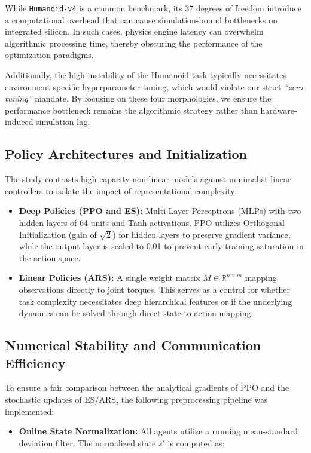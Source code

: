 While \texttt{Humanoid-v4} is a common benchmark, its 37 degrees of freedom introduce a computational overhead that can cause simulation-bound bottlenecks on integrated silicon. In such cases, physics engine latency can overwhelm algorithmic processing time, thereby obscuring the performance of the optimization paradigms. 

Additionally, the high instability of the Humanoid task typically necessitates environment-specific hyperparameter tuning, which would violate our strict \textit{``zero-tuning''} mandate. By focusing on these four morphologies, we ensure the performance bottleneck remains the algorithmic strategy rather than hardware-induced simulation lag.

\subsection{Policy Architectures and Initialization}

The study contrasts high-capacity non-linear models against minimalist linear controllers to isolate the impact of representational complexity:

\begin{itemize}
    \item \textbf{Deep Policies (PPO and ES):} Multi-Layer Perceptrons (MLPs) with two hidden layers of 64 units and Tanh activations. PPO utilizes Orthogonal Initialization (gain of $\sqrt{2}$) for hidden layers to preserve gradient variance, while the output layer is scaled to 0.01 to prevent early-training saturation in the action space.
    
    \item \textbf{Linear Policies (ARS):} A single weight matrix $M \in \mathbb{R}^{n \times m}$ mapping observations directly to joint torques. This serves as a control for whether task complexity necessitates deep hierarchical features or if the underlying dynamics can be solved through direct state-to-action mapping.
\end{itemize}

\subsection{Numerical Stability and Communication Efficiency}

To ensure a fair comparison between the analytical gradients of PPO and the stochastic updates of ES/ARS, the following preprocessing pipeline was implemented:

\begin{itemize}
    \item \textbf{Online State Normalization:} All agents utilize a running mean-standard deviation filter. The normalized state $s'$ is computed as:
\end{itemize}


